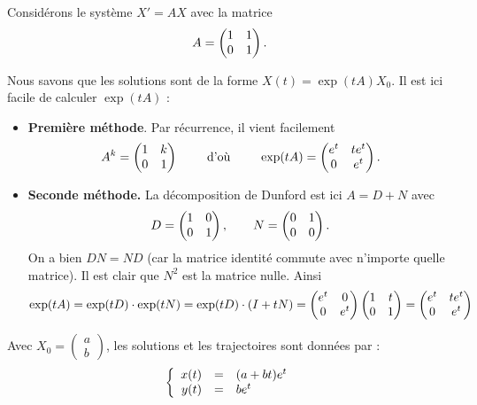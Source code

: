 \documentclass[12pt, class=report,crop=false]{standalone}
\begin{document}
\begin{exemple}
Considérons le système $X'=AX$ avec la matrice
$$A = \begin{pmatrix}1&1\cr 0&1\end{pmatrix}.$$

Nous savons que les solutions sont de la forme
$X(t) = \exp(tA) X_0$.
Il est ici facile de calculer $\exp(tA)$ :
\begin{itemize}
  \item \textbf{Première méthode}. Par récurrence, il vient facilement 
  $$A^k = \begin{pmatrix}1&k\cr 0&1\end{pmatrix}
  \qquad \text{ d'où } \qquad 
  \exp(tA) =  \begin{pmatrix}e^t& te^t\cr 0&e^t\end{pmatrix}.$$
  
  \item \textbf{Seconde méthode.} La décomposition de Dunford est ici
  $ A = D + N$ avec 
  $$D = \begin{pmatrix}1&0\cr 0&1\end{pmatrix}, \qquad
  N = \begin{pmatrix}0&1\cr 0&0\end{pmatrix}.$$
  On a bien $DN=ND$ (car la matrice identité commute avec n'importe quelle matrice).
  Il est clair que $N^2$ est la matrice nulle.
  Ainsi
  $$\exp(tA) = \exp(tD)\cdot \exp(tN) = \exp(tD) \cdot (I+tN)
  = \begin{pmatrix}e^t& 0\cr 0&e^t\end{pmatrix}
  \begin{pmatrix}1& t\cr 0&1\end{pmatrix}
  = \begin{pmatrix}e^t& te^t\cr 0&e^t\end{pmatrix}$$
  
\end{itemize}

Avec $X_0 =  \left(\begin{smallmatrix}a\\b\end{smallmatrix} \right)$,
les solutions et les trajectoires sont données par :
$$\left\{\begin{array}{rcl}
x(t) &=& (a+bt)e^t\cr  
y(t) &=& be^{t}
\end{array}\right.$$


\end{exemple}
\end{document}
